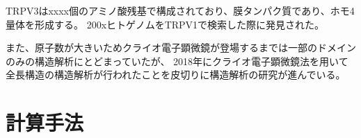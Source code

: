 TRPV3はxxxx個のアミノ酸残基で構成されており、膜タンパク質であり、ホモ4量体を形成する。%
200xヒトゲノムをTRPV1で検索した際に発見された。%

また、原子数が大きいためクライオ電子顕微鏡が登場するまでは一部のドメインのみの構造解析にとどまっていたが、
2018年にクライオ電子顕微鏡法を用いて全長構造の構造解析が行われた\autocite{singhStructureGatingMechanism2018,zubcevic_conformational_2018}ことを皮切りに構造解析の研究が進んでいる。

\section{計算手法}

